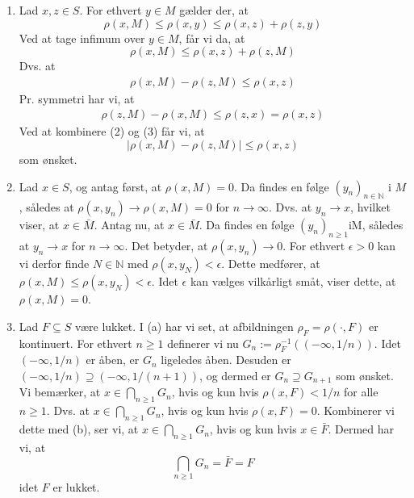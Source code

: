 \documentclass{Class}
\newcommand{\N}{\mathbb{N}}
\newcommand{\1}{\mathbbm{1}}
\theoremstyle{boxed}
\begin{document}
\begin{enumerate}
  \item Lad $x, z \in S$. For ethvert $y \in M$ gælder der, at
  $$
  \rho(x, M) \leq \rho(x, y) \leq \rho(x, z)+\rho(z, y)
  $$
  Ved at tage infimum over $y \in M$, får vi da, at
  $$
  \rho(x, M) \leq \rho(x, z)+\rho(z, M)
  $$
  Dvs. at
  \begin{align}
    \rho(x, M)-\rho(z, M) \leq \rho(x, z)
  \end{align}
  Pr. symmetri har vi, at
  \begin{align}
    \rho(z, M)-\rho(x, M) \leq \rho(z, x)=\rho(x, z)
  \end{align}
  Ved at kombinere (2) og (3) får vi, at
  $$
  |\rho(x, M)-\rho(z, M)| \leq \rho(x, z)
  $$
  som ønsket.
  \item Lad $x \in S$, og antag først, at $\rho(x, M)=0$. Da findes en følge $\left(y_n\right)_{n \in\N}$ i $M$, således at $\rho\left(x, y_n\right) \rightarrow \rho(x, M)=0$ for $n \rightarrow \infty$. Dvs. at $y_n \rightarrow x$, hvilket viser, at $x \in \bar{M}$.
  Antag nu, at $x \in \bar{M}$. Da findes en følge $\left(y_n\right)_{n \geq 1} \mathrm{i} \mathrm{M}$, således at $y_n \rightarrow x$ for $n \rightarrow \infty$. Det betyder, at $\rho\left(x, y_n\right) \rightarrow 0$. For ethvert $\epsilon>0$ kan vi derfor finde $N \in \mathbb{N}$ med $\rho\left(x, y_N\right)<\epsilon$. Dette medfører, at $\rho(x, M) \leq \rho\left(x, y_N\right)<\epsilon$. Idet $\epsilon$ kan vælges vilkårligt småt, viser dette, at $\rho(x, M)=0$.
  \item Lad $F \subseteq S$ være lukket. I (a) har vi set, at afbildningen $\rho_F=\rho(\cdot, F)$ er kontinuert. For ethvert $n \geq 1$ definerer vi nu $G_n:=\rho_F^{-1}((-\infty, 1 / n))$. Idet $(-\infty, 1 / n)$ er åben, er $G_n$ ligeledes åben. Desuden er $(-\infty, 1 / n) \supseteq(-\infty, 1 /(n+1))$, og dermed er $G_n \supseteq G_{n+1}$ som ønsket. Vi bemærker, at $x \in \bigcap_{n \geq 1} G_n$, hvis og kun hvis $\rho(x, F)<1 / n$ for alle $n \geq 1$. Dvs. at $x \in \bigcap_{n \geq 1} G_n$, hvis og kun hvis $\rho(x, F)=0$. Kombinerer vi dette med (b), ser vi, at $x \in \bigcap_{n \geq 1} G_n$, hvis og kun hvis $x \in \bar{F}$. Dermed har vi, at
  $$
  \bigcap_{n \geq 1} G_n=\bar{F}=F
  $$
  idet $F$ er lukket.
\end{enumerate}
\end{document}

